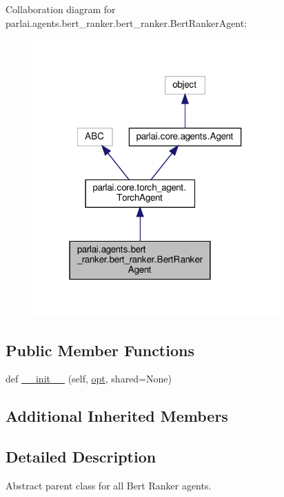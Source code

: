 Collaboration diagram for parlai.\+agents.\+bert\+\_\+ranker.\+bert\+\_\+ranker.\+Bert\+Ranker\+Agent\+:
\nopagebreak
\begin{figure}[H]
\begin{center}
\leavevmode
\includegraphics[width=267pt]{d9/df4/classparlai_1_1agents_1_1bert__ranker_1_1bert__ranker_1_1BertRankerAgent__coll__graph}
\end{center}
\end{figure}
\subsection*{Public Member Functions}
\begin{DoxyCompactItemize}
\item 
def \hyperlink{classparlai_1_1agents_1_1bert__ranker_1_1bert__ranker_1_1BertRankerAgent_a1df3920ae23af044ca5abab9b0c46b10}{\+\_\+\+\_\+init\+\_\+\+\_\+} (self, \hyperlink{classparlai_1_1core_1_1torch__agent_1_1TorchAgent_a785bb920cf8c8afc3e9bf6a8b77e335a}{opt}, shared=None)
\end{DoxyCompactItemize}
\subsection*{Additional Inherited Members}


\subsection{Detailed Description}
\begin{DoxyVerb}Abstract parent class for all Bert Ranker agents.
\end{DoxyVerb}
 

